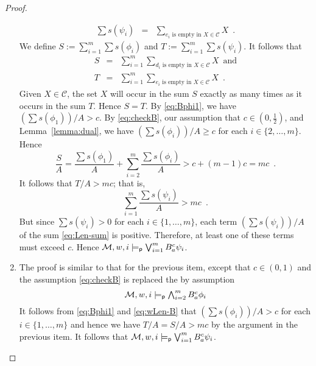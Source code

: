 \documentclass[12pt]{article}
\newcommand{\XXXcomment}[1]{}
\newcommand{\XXXcomment}[1]{\marginpar{\color{blue}{\footnotesize #1}}}
\theoremstyle{definition}
\newcommand{\M}{{\cal M}}      %
\newcommand{\modelsp}{\models_{\mathsf{p}}}                  %
\begin{document}
\begin{proof}
\begin{enumerate}
\begin{eqnarray*}
      \textstyle
      \sum s(\psi_i) &=&
      \sum_{\text{$e_i$ is empty in $X\in\mathcal{C}$}} X \enspace\text{.}
    \end{eqnarray*}
    We define $S:=\sum_{i=1}^m\sum s(\phi_i)$ and $T:=\sum_{i=1}^m\sum
    s(\psi_i)$.  It follows that
    \begin{eqnarray*}
      S &=&
      \sum_{i=1}^m\sum_{\text{$d_i$ is empty in $X\in\mathcal{C}$}} X \enspace\text{and}
      \\
      T &=&
      \sum_{i=1}^m\sum_{\text{$e_i$ is empty in $X\in\mathcal{C}$}} X \enspace\text{.}
    \end{eqnarray*}
    Given $X\in\mathcal{C}$, the set $X$ will occur in the sum $S$
    exactly as many times as it occurs in the sum $T$.  Hence $S=T$.
    By \eqref{eq:Bphi1}, we have $(\sum s(\phi_1))/A>c$.  By
    \eqref{eq:checkB}, our assumption that $c\in(0,\frac 12)$, and
    Lemma~\ref{lemma:dual}, we have $(\sum s(\phi_i))/A\geq c$ for
    each $i\in\{2,\dots,m\}$.  Hence
    \[
    \frac SA = \frac{\sum s(\phi_1)}A + \sum_{i=2}^m\frac{\sum
      s(\phi_i)}A > c + (m-1)c = mc\enspace.
    \]
    It follows that $T/A>mc$; that is,
    \begin{equation}
      \sum_{i=1}^m \frac{\sum s(\psi_i)}A > mc\enspace.
      \label{eq:Len-sum}
    \end{equation}
    But since $\sum s(\psi_i)>0$ for each $i\in\{1,\dots,m\}$, each
    term $(\sum s(\psi_i))/A$ of the sum \eqref{eq:Len-sum} is
    positive.  Therefore, at least one of these terms must exceed $c$.
    Hence $\M,w,i\modelsp\bigvee_{i=1}^m B_a^c\psi_i$.

    \XXXcomment{Not sure I am completely happy with the clarity of the
      proof of Item~\ref{item:B-Len} (my adaptation of Segerberg's
      proof).  I wonder if it might be more straightforward to simply
      argue $ \sum s(\phi_1) + \cdots + \sum s(\phi_m) = \sum
      s(\psi_1) + \cdots + \sum s(\psi_m) $ directly, maybe using our
      notation $F(\phi)$ for $\sum s(\phi)$. \hfill --br}

  \item The proof is similar to that for the previous item, except
    that $c\in(0,1)$ and the assumption \eqref{eq:checkB} is replaced
    the by assumption
    \begin{equation}
      \textstyle
      \M,w,i\modelsp \bigwedge_{i=2}^m B^c_a\phi_i
      \label{eq:wLen-B}
    \end{equation}
    It follows from \eqref{eq:Bphi1} and \eqref{eq:wLen-B} that $(\sum
    s(\phi_i))/A>c$ for each $i\in\{1,\dots,m\}$ and hence we have
    $T/A=S/A>mc$ by the argument in the previous item.  It follows
    that $\M,w,i\modelsp\bigvee_{i=1}^m B_a^c\psi_i$.  \qedhere
  \end{enumerate}
\end{proof}
\end{document}
